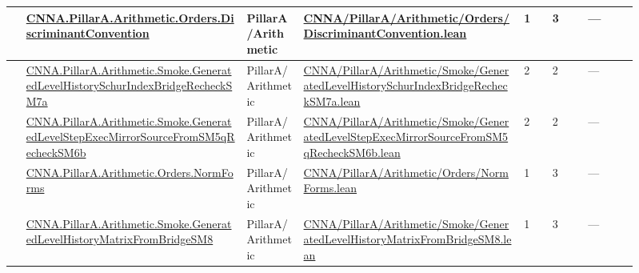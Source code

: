 \begin{longtable}{L{0.025\linewidth} L{0.315\linewidth} L{0.08\linewidth} L{0.315\linewidth} L{0.045\linewidth} L{0.055\linewidth} L{0.07\linewidth}}
\hline
{} & \href{run:repo_snapshot/CNNA/PillarA/Arithmetic/Orders/DiscriminantConvention.lean}{CNNA.\allowbreak{}PillarA.\allowbreak{}Arithmetic.\allowbreak{}Orders.\allowbreak{}DiscriminantConvention} & PillarA/\allowbreak{}Arithmetic & \href{run:repo_snapshot/CNNA/PillarA/Arithmetic/Orders/DiscriminantConvention.lean}{CNNA/\allowbreak{}PillarA/\allowbreak{}Arithmetic/\allowbreak{}Orders/\allowbreak{}DiscriminantConvention.\allowbreak{}lean} & 1 & 3 & ---\\
\hline
{} & \href{run:repo_snapshot/CNNA/PillarA/Arithmetic/Smoke/GeneratedLevelHistorySchurIndexBridgeRecheckSM7a.lean}{CNNA.\allowbreak{}PillarA.\allowbreak{}Arithmetic.\allowbreak{}Smoke.\allowbreak{}GeneratedLevelHistorySchurIndexBridgeRecheckSM7a} & PillarA/\allowbreak{}Arithmetic & \href{run:repo_snapshot/CNNA/PillarA/Arithmetic/Smoke/GeneratedLevelHistorySchurIndexBridgeRecheckSM7a.lean}{CNNA/\allowbreak{}PillarA/\allowbreak{}Arithmetic/\allowbreak{}Smoke/\allowbreak{}GeneratedLevelHistorySchurIndexBridgeRecheckSM7a.\allowbreak{}lean} & 2 & 2 & ---\\
\hline
{} & \href{run:repo_snapshot/CNNA/PillarA/Arithmetic/Smoke/GeneratedLevelStepExecMirrorSourceFromSM5qRecheckSM6b.lean}{CNNA.\allowbreak{}PillarA.\allowbreak{}Arithmetic.\allowbreak{}Smoke.\allowbreak{}GeneratedLevelStepExecMirrorSourceFromSM5qRecheckSM6b} & PillarA/\allowbreak{}Arithmetic & \href{run:repo_snapshot/CNNA/PillarA/Arithmetic/Smoke/GeneratedLevelStepExecMirrorSourceFromSM5qRecheckSM6b.lean}{CNNA/\allowbreak{}PillarA/\allowbreak{}Arithmetic/\allowbreak{}Smoke/\allowbreak{}GeneratedLevelStepExecMirrorSourceFromSM5qRecheckSM6b.\allowbreak{}lean} & 2 & 2 & ---\\
\hline
{} & \href{run:repo_snapshot/CNNA/PillarA/Arithmetic/Orders/NormForms.lean}{CNNA.\allowbreak{}PillarA.\allowbreak{}Arithmetic.\allowbreak{}Orders.\allowbreak{}NormForms} & PillarA/\allowbreak{}Arithmetic & \href{run:repo_snapshot/CNNA/PillarA/Arithmetic/Orders/NormForms.lean}{CNNA/\allowbreak{}PillarA/\allowbreak{}Arithmetic/\allowbreak{}Orders/\allowbreak{}NormForms.\allowbreak{}lean} & 1 & 3 & ---\\
\hline
{} & \href{run:repo_snapshot/CNNA/PillarA/Arithmetic/Smoke/GeneratedLevelHistoryMatrixFromBridgeSM8.lean}{CNNA.\allowbreak{}PillarA.\allowbreak{}Arithmetic.\allowbreak{}Smoke.\allowbreak{}GeneratedLevelHistoryMatrixFromBridgeSM8} & PillarA/\allowbreak{}Arithmetic & \href{run:repo_snapshot/CNNA/PillarA/Arithmetic/Smoke/GeneratedLevelHistoryMatrixFromBridgeSM8.lean}{CNNA/\allowbreak{}PillarA/\allowbreak{}Arithmetic/\allowbreak{}Smoke/\allowbreak{}GeneratedLevelHistoryMatrixFromBridgeSM8.\allowbreak{}lean} & 1 & 3 & ---\\

\end{longtable}
